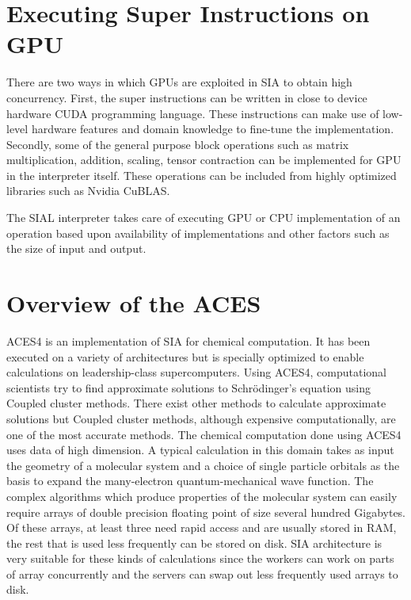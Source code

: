 \section{Executing Super Instructions on GPU}
There are two ways in which GPUs are exploited in SIA to obtain high concurrency.
First, the super instructions can be written in close to device hardware CUDA
programming language. These instructions can make use of low-level hardware
features and domain knowledge to fine-tune the implementation. Secondly, some of
the general purpose block operations such as matrix multiplication, addition,
scaling, tensor contraction can be implemented for GPU in the interpreter
itself. These operations can be included from highly optimized libraries such as
Nvidia CuBLAS.

The SIAL interpreter takes care of executing GPU or CPU implementation of an
operation based upon availability of implementations and other factors such as
the size of input and output.

\section{Overview of the ACES}
ACES4 is an implementation of SIA for chemical computation. It has been executed
on a variety of architectures but is specially optimized to enable
calculations on leadership-class supercomputers. Using ACES4, computational scientists
try to find approximate solutions to Schrödinger’s equation using Coupled cluster
methods. There exist other methods to calculate approximate solutions but Coupled
cluster methods, although expensive computationally, are one of the most accurate methods.
The chemical computation done using ACES4 uses data of high dimension. A typical calculation in this domain
takes as input the geometry of a molecular system and a choice of single
particle orbitals as the basis to expand the many-electron quantum-mechanical wave
function. The complex algorithms which produce properties of the molecular
system can easily require arrays of double precision floating point of size
several hundred Gigabytes. Of these arrays, at least three need rapid access and
are usually stored in RAM, the rest that is used less frequently can be stored
on disk. SIA architecture is very suitable for these kinds of calculations since
the workers can work on parts of array concurrently and the servers can swap out
less frequently used arrays to disk.